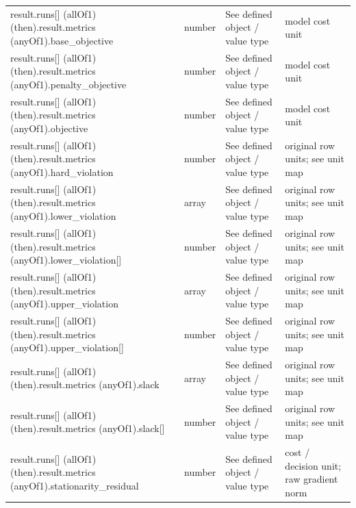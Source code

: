 \begin{longtable}{@{}>{\raggedright\arraybackslash}p{}>{\raggedright\arraybackslash}p{}>{\raggedright\arraybackslash}p{}>{\raggedright\arraybackslash}p{}@{}}
result.\allowbreak{}runs[] (allOf1) (then).\allowbreak{}result.\allowbreak{}metrics (anyOf1).\allowbreak{}base\_\allowbreak{}objective & number & See defined object /\allowbreak{} value type & model cost unit\\
result.\allowbreak{}runs[] (allOf1) (then).\allowbreak{}result.\allowbreak{}metrics (anyOf1).\allowbreak{}penalty\_\allowbreak{}objective & number & See defined object /\allowbreak{} value type & model cost unit\\
result.\allowbreak{}runs[] (allOf1) (then).\allowbreak{}result.\allowbreak{}metrics (anyOf1).\allowbreak{}objective & number & See defined object /\allowbreak{} value type & model cost unit\\
result.\allowbreak{}runs[] (allOf1) (then).\allowbreak{}result.\allowbreak{}metrics (anyOf1).\allowbreak{}hard\_\allowbreak{}violation & number & See defined object /\allowbreak{} value type & original row units; see unit map\\
result.\allowbreak{}runs[] (allOf1) (then).\allowbreak{}result.\allowbreak{}metrics (anyOf1).\allowbreak{}lower\_\allowbreak{}violation & array & See defined object /\allowbreak{} value type & original row units; see unit map\\
result.\allowbreak{}runs[] (allOf1) (then).\allowbreak{}result.\allowbreak{}metrics (anyOf1).\allowbreak{}lower\_\allowbreak{}violation[] & number & See defined object /\allowbreak{} value type & original row units; see unit map\\
result.\allowbreak{}runs[] (allOf1) (then).\allowbreak{}result.\allowbreak{}metrics (anyOf1).\allowbreak{}upper\_\allowbreak{}violation & array & See defined object /\allowbreak{} value type & original row units; see unit map\\
result.\allowbreak{}runs[] (allOf1) (then).\allowbreak{}result.\allowbreak{}metrics (anyOf1).\allowbreak{}upper\_\allowbreak{}violation[] & number & See defined object /\allowbreak{} value type & original row units; see unit map\\
result.\allowbreak{}runs[] (allOf1) (then).\allowbreak{}result.\allowbreak{}metrics (anyOf1).\allowbreak{}slack & array & See defined object /\allowbreak{} value type & original row units; see unit map\\
result.\allowbreak{}runs[] (allOf1) (then).\allowbreak{}result.\allowbreak{}metrics (anyOf1).\allowbreak{}slack[] & number & See defined object /\allowbreak{} value type & original row units; see unit map\\
result.\allowbreak{}runs[] (allOf1) (then).\allowbreak{}result.\allowbreak{}metrics (anyOf1).\allowbreak{}stationarity\_\allowbreak{}residual & number & See defined object /\allowbreak{} value type & cost /\allowbreak{} decision unit; raw gradient norm\\

\end{longtable}
